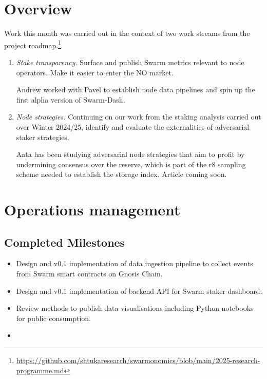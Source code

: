 \maketitle
\section*{Overview}

Work this month was carried out in the context of two work streams from the project roadmap.\footnote{\url{https://github.com/shtukaresearch/swarmonomics/blob/main/2025-research-programme.md}}

\begin{enumerate}
\item \emph{Stake transparency.} Surface and publish Swarm metrics relevant to node operators. Make it easier to enter the NO market.

Andrew worked with Pavel to establish node data pipelines and spin up the first alpha version of Swarm-Dash.

\item \emph{Node strategies.}  Continuing on our work from the staking analysis carried out over Winter 2024/25, identify and evaluate the externalities of adversarial staker strategies.

Aata has been studying adversarial node strategies that aim to profit by undermining consensus over the reserve, which is part of the r8 sampling scheme needed to establish the storage index. Article coming soon.

\end{enumerate}
\section*{Operations management}

\subsection*{Completed Milestones}

\begin{itemize}
  \item 
    Design and v0.1 implementation of data ingestion pipeline to collect events from Swarm smart contracts on Gnosis Chain.
  \item 
    Design and v0.1 implementation of backend API for Swarm staker dashboard.
  \item
    Review methods to publish data visualisations including Python notebooks for public consumption.
  \item

\end{itemize}


